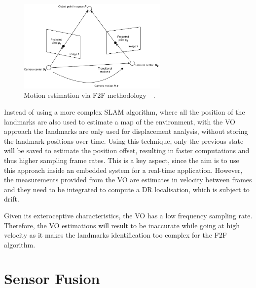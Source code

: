 \begin{figure}[!ht]
  \begin{center}
    \includegraphics[width=0.65\textwidth]{Images/2-Background/VO.pdf}
  \end{center}
  \caption{Motion estimation via \gls{F2F} methodology~\cite{camera}~\cite{cameraa}.}
  \label{fig:camera}
\end{figure}

Instead of using a more complex \gls{SLAM} algorithm, where all the position of the landmarks are also used to estimate a map of the environment, with the \gls{VO} approach the landmarks are only used for displacement analysis, without storing the landmark positions over time.
Using this technique, only the previous state will be saved to estimate the position offset, resulting in faster computations and thus higher sampling frame rates.
This is a key aspect, since the aim is to use this approach inside an embedded system for a real-time application. 
However, the measurements provided from the \gls{VO} are estimates in velocity between frames and they need to be integrated to compute a \gls{DR} localisation, which is subject to drift.


Given its exteroceptive characteristics, the \gls{VO} has a low frequency sampling rate.
Therefore, the \gls{VO} estimations will result to be inaccurate while going at high velocity as it makes the landmarks identification too complex for the \gls{F2F} algorithm.



\section{Sensor Fusion}


